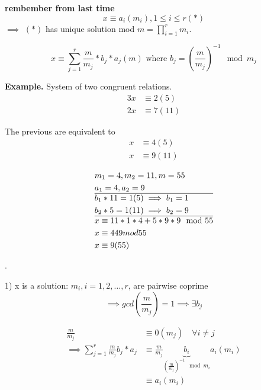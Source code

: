 

\textbf{rembember from last time}
\[
  x \equiv a_i (m_i), 1 \leq i \leq r (*)
\]
$\implies$ $(*)$ has unique solution mod $m = \prod_{i = 1}^r m_i$. 

\[
  x \equiv \sum_{j=1}^r \frac {m}{m_j} * b_j * a_j (m) \text{ where }
  b_j = \left( \frac{m}{m_j} \right) ^{-1} \mod m_j
\]

\textbf{Example.}
System of two congruent relations.
\begin{align*}
  3x &\equiv 2 (5) \\
  2x &\equiv 7 (11)
\end{align*}

The previous are equivalent to
\begin{align*}
  x &\equiv 4 (5) \\
  x &\equiv 9 (11)
\end{align*}

\begin{align*}
  &m_1 = 4, m_2 = 11, m = 55 \\
  &a_1 = 4, a_2 = 9 \\
  \hline
  &b_1 * 11 = 1 (5)  \implies b_1 = 1 \\
  &b_2 *5 = 1 (11) \implies b_2 = 9 \\
  \hline
  & x \equiv 11 * 1 * 4 + 5 *9 *9 \mod 55\\
  & x \equiv 449 mod 55 \\
  & x \equiv 9 (55)
\end{align*}

\Proof.

1) x is a solution: $m_i, i = 1,2, \ldots, r$, are pairwise coprime 
\[
  \implies gcd\left(\frac{m}{m_j}\right) = 1 \implies \exists b_j
\]

\begin{align*}
  \frac{m}{m_j} &\equiv 0 (m_j) \quad \forall i \neq j \\
  \implies \sum_{j=1}^{r}\frac{m}{m_j} b_j * a_j &\equiv 
    \frac{m}{m_j} \underbrace{b_i}_{(\frac{m}{m_j})^{-1} \mod m_i} a_i (m_i) \\
  &\equiv a_i (m_i)
\end{align*}

